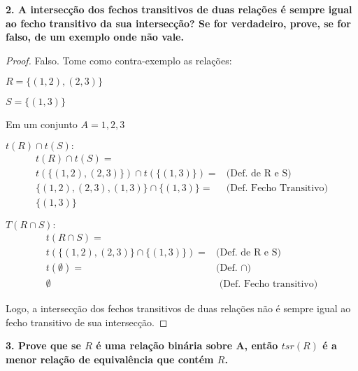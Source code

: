 \documentclass[12pt]{article}
\begin{document}
\textbf{2.  A intersecção dos fechos transitivos de duas relações é sempre igual ao fecho transitivo da
sua intersecção? Se for verdadeiro, prove, se for falso, de um exemplo onde não vale.}

\begin{proof}
Falso. Tome como contra-exemplo as relações:


$R = \{(1,2), (2,3)\}$


$S = \{(1,3)\}$


Em um conjunto $A = {1,2,3}$


$t(R) \cap t(S):$
\begin{align*}
t(R) \cap t(S) = 
\\ t(\{(1,2),(2,3)\}) \cap t(\{(1,3)\}) = 
&\text{(Def. de R e S)}\\ \{(1,2),(2,3),(1,3)\} \cap \{(1,3)\} = 
&\text{(Def. Fecho Transitivo)} \\ \{(1,3)\} 
\end{align*}

$T(R \cap S):$
\begin{align*}
t(R \cap S) = 
\\ t(\{(1,2),(2,3)\} \cap \{(1,3)\}) =
&\text{(Def. de R e S)}\\ t(\emptyset) = 
&\text{(Def. } \cap)\\ \emptyset
&\text{ (Def. Fecho transitivo)}\end{align*}



Logo, a intersecção dos fechos transitivos de duas relações não é sempre igual ao fecho transitivo de sua intersecção.
\end{proof}

\textbf{3. Prove que se $R$ é uma relação binária sobre A, então $tsr(R)$ é a menor relação de equivalência que contém $R$.}
\end{document}
